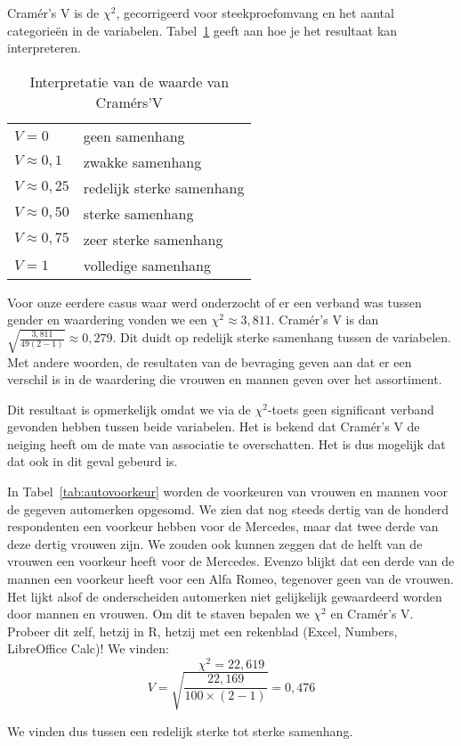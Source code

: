 Cramér's V is de $\chi^{2}$, gecorrigeerd voor steekproefomvang en het aantal categorieën in de variabelen. Tabel~\ref{tab:interpretatie-cramers-v} geeft aan hoe je het resultaat kan interpreteren.

\begin{table}
  \centering
  \begin{tabular}{ll}
    $V = 0$ & geen samenhang \\
    $V \approx 0,1$ & zwakke samenhang \\
    $V \approx 0,25$ & redelijk sterke samenhang \\
    $V \approx 0,50$ & sterke samenhang \\
    $V \approx 0,75$ & zeer sterke samenhang \\
    $V = 1$ & volledige samenhang \\
  \end{tabular}
  \caption{Interpretatie van de waarde van Cramérs'V}
  \label{tab:interpretatie-cramers-v}
\end{table}

Voor onze eerdere casus waar werd onderzocht of er een verband was tussen gender en waardering vonden we een $\chi^{2} \approx 3,811$. Cramér's V is dan $\sqrt{\frac{3,811}{49 (2 - 1)}} \approx 0,279$. Dit duidt op redelijk sterke samenhang tussen de variabelen. Met andere woorden, de resultaten van de bevraging geven aan dat er een verschil is in de waardering die vrouwen en mannen geven over het assortiment.

Dit resultaat is opmerkelijk omdat we via de $\chi^2$-toets geen significant verband gevonden hebben tussen beide variabelen. Het is bekend dat Cramér's V de neiging heeft om de mate van associatie te overschatten. Het is dus mogelijk dat dat ook in dit geval gebeurd is.

\begin{example}
  In Tabel~\ref{tab:autovoorkeur} worden de voorkeuren van vrouwen en mannen voor de gegeven automerken opgesomd. We zien dat nog steeds dertig van de honderd respondenten een voorkeur hebben voor de Mercedes, maar dat twee derde van deze dertig vrouwen zijn. We zouden  ook kunnen zeggen dat de helft van de vrouwen een voorkeur heeft voor de Mercedes. Evenzo blijkt dat een derde van de mannen een voorkeur heeft voor een Alfa Romeo, tegenover geen van de vrouwen. Het lijkt alsof de onderscheiden automerken niet gelijkelijk gewaardeerd worden door mannen en vrouwen. Om dit te staven bepalen we $\chi^{2}$ en Cramér's V. Probeer dit zelf, hetzij in R, hetzij met een rekenblad (Excel, Numbers, LibreOffice Calc)! We vinden:
  \[ \chi^{2} = 22,619 \]
  \[ V = \sqrt{\frac{22,169}{100 \times (2-1)}}  = 0,476\]
  
  We vinden dus tussen een redelijk sterke tot sterke samenhang.
\end{example}


